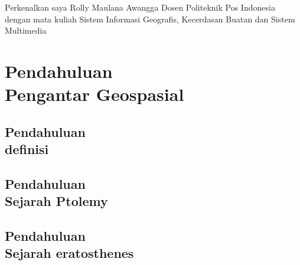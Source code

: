 \documentclass{WileySix}
\begin{document}



\begin{introduction}
 Perkenalkan saya Rolly Maulana Awangga Dosen Politeknik Pos Indonesia dengan mata kuliah
Sistem Informasi Geografis, Kecerdasan Buatan dan Sistem Multimedia
\end{introduction}

\part[Pendahuluan]
{Pendahuluan\\ Pengantar Geospasial}

\chapter[Definisi]
{Pendahuluan\\ definisi}


\chapter[Sejarah Ptolemy]
{Pendahuluan\\ Sejarah Ptolemy}


\chapter[Sejarah eratosthenes]
{Pendahuluan\\ Sejarah eratosthenes}



%
\end{document}
